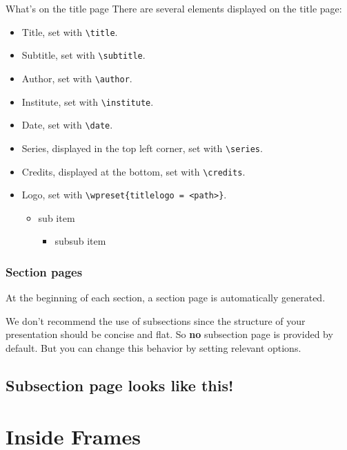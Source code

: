 \documentclass[no-math, aspectratio=1610, 10pt]{beamer}
\begin{document}
    \begin{frame}[fragile]{What's on the title page}
        There are several elements displayed on the title page:
        \begin{itemize}
            \item Title, set with \verb|\title|.
            \item Subtitle, set with \verb|\subtitle|.
            \item Author, set with \verb|\author|.
            \item Institute, set with \verb|\institute|.
            \item Date, set with \verb|\date|.
            \item Series, displayed in the top left corner, set with \verb|\series|.
            \item Credits, displayed at the bottom, set with \verb|\credits|.
            \item Logo, set with \verb|\wpreset{titlelogo = <path>}|.
            \begin{itemize}
                \item sub item
                \begin{itemize}
                    \item subsub item
                \end{itemize}
            \end{itemize}
        \end{itemize}
    \end{frame}

    \begin{frame}
        \frametitle{Section pages}
        At the beginning of each section, a section page is automatically generated. 
        
        We don't recommend the use of subsections since the structure of your presentation should be concise and flat. So \textbf{no} subsection page is provided by default. But you can change this behavior by setting relevant options.
    \end{frame}

    \subsection{Subsection page looks like this!}

    \section{Inside Frames}
\end{document}
